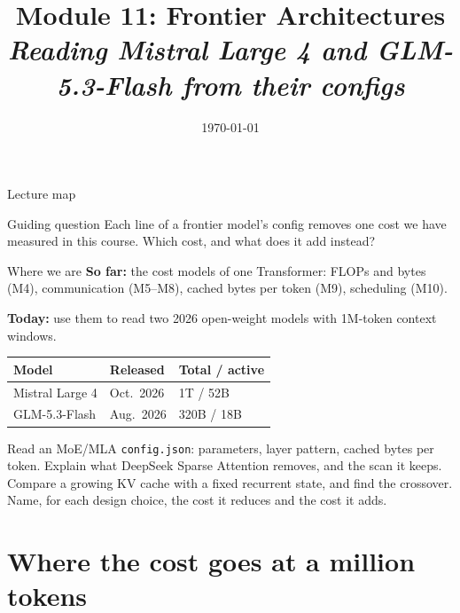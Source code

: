 \documentclass[handout]{beamer}
\title[TASLLM -- Module 11]{Module 11: Frontier Architectures\\[4pt]
\normalsize\itshape Reading Mistral Large 4 and GLM-5.3-Flash from their configs}
\date{\today}
\begin{document}
\makelecturetitle

\begin{frame}{Lecture map}
  \tableofcontents
  \vfill
  \begin{block}{Guiding question}
    Each line of a frontier model's config removes one cost we have measured in this course. Which cost, and what does it add instead?
  \end{block}
\end{frame}

\begin{frame}{Where we are}
  \vspace{10pt}
  \textbf{\textcolor{accentdark}{So far:}} the cost models of one Transformer: FLOPs and bytes (M4), communication (M5--M8), cached bytes per token (M9), scheduling (M10).\par
  \vspace{10pt}
  \textbf{\textcolor{signaldark}{Today:}} use them to read two 2026 open-weight models with 1M-token context windows.
  \vfill
  \begin{center}
    \small
    \begin{tabular}{@{}lll@{}}
      \toprule
      Model & Released & Total / active \\
      \midrule
      Mistral Large 4 & Oct.\ 2026 & 1T / 52B \\
      GLM-5.3-Flash & Aug.\ 2026 & 320B / 18B \\
      \bottomrule
    \end{tabular}
  \end{center}
\end{frame}

\learninggoals
{Read an MoE/MLA \texttt{config.json}: parameters, layer pattern, cached bytes per token.}
{Explain what DeepSeek Sparse Attention removes, and the scan it keeps.}
{Compare a growing KV cache with a fixed recurrent state, and find the crossover.}
{Name, for each design choice, the cost it reduces and the cost it adds.}

\section{Where the cost goes at a million tokens}
\end{document}
